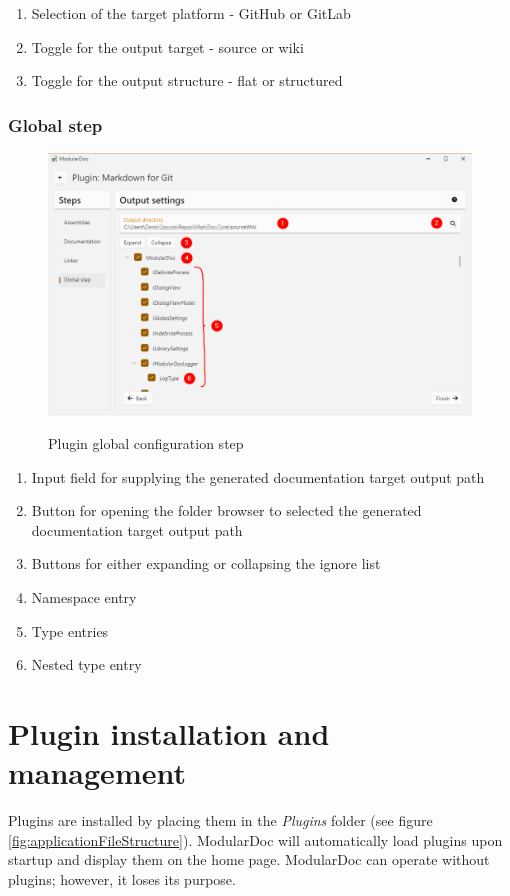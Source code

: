 \begin{enumerate}
    \item Selection of the target platform - GitHub or GitLab
    \item Toggle for the output target - source or wiki
    \item Toggle for the output structure - flat or structured
\end{enumerate}

\subsubsection{Global step}

\begin{figure}[H]
    \includegraphics[width=\linewidth]{img/modularDocGlobalSettings.png}
    \label{fig:modularGlobal}
    \caption{Plugin global configuration step}
\end{figure}

\begin{enumerate}
    \item Input field for supplying the generated documentation target output path
    \item Button for opening the folder browser to selected the generated documentation target output path
    \item Buttons for either expanding or collapsing the ignore list
    \item Namespace entry
    \item Type entries
    \item Nested type entry
\end{enumerate}

\section{Plugin installation and management}

Plugins are installed by placing them in the \textit{Plugins} folder (see figure \ref{fig:applicationFileStructure}). ModularDoc will automatically load plugins upon startup and display them on the home page. ModularDoc can operate without plugins; however, it loses its purpose.




